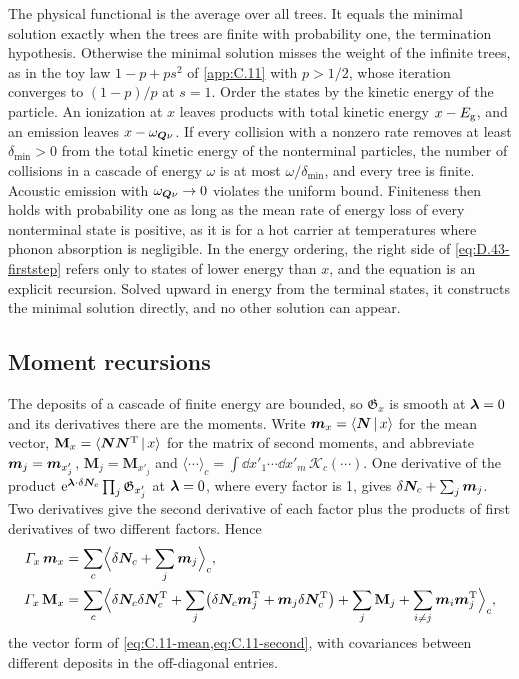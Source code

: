 The physical functional is the average over all trees. It equals the minimal solution exactly when the trees are finite with probability one, the termination hypothesis. Otherwise the minimal solution misses the weight of the infinite trees, as in the toy law $1 - p + ps^2$ of \cref{app:C.11} with $p > 1/2$, whose iteration converges to $(1 - p)/p$ at $s = 1$. Order the states by the kinetic energy of the particle. An ionization at $x$ leaves products with total kinetic energy $x - E_{\mathrm{g}}$, and an emission leaves $x - \omega_{\bm{Q}\nu}$. If every collision with a nonzero rate removes at least $\delta_{\min} > 0$ from the total kinetic energy of the nonterminal particles, the number of collisions in a cascade of energy $\omega$ is at most $\omega/\delta_{\min}$, and every tree is finite. Acoustic emission with $\omega_{\bm{Q}\nu} \to 0$ violates the uniform bound. Finiteness then holds with probability one as long as the mean rate of energy loss of every nonterminal state is positive, as it is for a hot carrier at temperatures where phonon absorption is negligible. In the energy ordering, the right side of \cref{eq:D.43-firststep} refers only to states of lower energy than $x$, and the equation is an explicit recursion. Solved upward in energy from the terminal states, it constructs the minimal solution directly, and no other solution can appear.

\subsection{Moment recursions}

The deposits of a cascade of finite energy are bounded, so $\mathfrak{G}_x$ is smooth at $\bm{\lambda} = 0$ and its derivatives there are the moments. Write $\bm{m}_x = \langle\bm{N}\,|\,x\rangle$ for the mean vector, $\mathbf{M}_x = \langle\bm{N}\bm{N}^{\mathrm{T}}\,|\,x\rangle$ for the matrix of second moments, and abbreviate $\bm{m}_j = \bm{m}_{x'_j}$, $\mathbf{M}_j = \mathbf{M}_{x'_j}$ and $\langle\cdots\rangle_c = \int\dd x'_1\cdots\dd x'_m\,\mathscr{K}_c(\cdots)$. One derivative of the product $\mathrm{e}^{\bm{\lambda}\cdot\delta\bm{N}_c}\prod_j\mathfrak{G}_{x'_j}$ at $\bm{\lambda} = 0$, where every factor is 1, gives $\delta\bm{N}_c + \sum_j\bm{m}_j$. Two derivatives give the second derivative of each factor plus the products of first derivatives of two different factors. Hence
\begin{align}
  \varGamma_x\,\bm{m}_x &= \sum_c\Bigl\langle\delta\bm{N}_c + \sum_j\bm{m}_j\Bigr\rangle_c ,
  \label{eq:D.43-mean}\\
  \varGamma_x\,\mathbf{M}_x &= \sum_c\Bigl\langle\delta\bm{N}_c\delta\bm{N}_c^{\mathrm{T}} + \sum_j\bigl(\delta\bm{N}_c\bm{m}_j^{\mathrm{T}} + \bm{m}_j\delta\bm{N}_c^{\mathrm{T}}\bigr) + \sum_j\mathbf{M}_j + \sum_{i\neq j}\bm{m}_i\bm{m}_j^{\mathrm{T}}\Bigr\rangle_c ,
  \label{eq:D.43-second}
\end{align}
the vector form of \cref{eq:C.11-mean,eq:C.11-second}, with covariances between different deposits in the off-diagonal entries.

